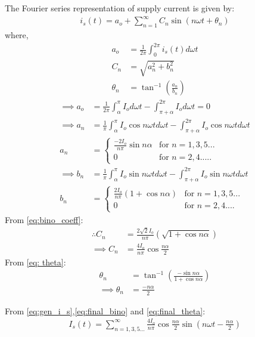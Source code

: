 \documentclass[journal,12pt,onecolumn]{IEEEtran}
\theoremstyle{remark}
\begin{document}
The Fourier series representation of supply current is given by:
\begin{align}
    i_s(t) = a_o +\sum_{n=1}^{\infty}C_n\sin({n\omega t} + \theta_n)\label{eq:gen_i_s}
\end{align}
 where,
 \begin{align}
 a_o &= \frac{1}{2\pi} \int_{0}^{2\pi} i_s(t)d\omega t \\
     C_n &= \sqrt{a_n^2 + b_n ^2}\label{eq:bino_coeff}\\
     \theta_n &= \tan^{-1}\left({\frac{a_n}{b_n}}\right)\label{eq: theta}
 \end{align}
\begin{align}
  \implies  a_o &= \frac{1}{2\pi}\int_{\alpha}^{\pi} I_o d\omega t - \int_{\pi + \alpha}^{2\pi} I_o d\omega t = 0\\
 \implies   a_n &= \frac{1}{\pi} \int_{\alpha}^{\pi}I_o\cos n\omega t d\omega t - \int_{\pi + \alpha}^{2\pi} I_o\cos{n\omega td\omega t}\\
 a_n &= 
 \begin{cases}
    \frac{-2I_o}{n\pi}\sin{n\alpha} & \text{for } n = 1,3,5...\\
     0 &\text{for } n = 2,4.....
    \end{cases}\\
 \implies   b_n &= \frac{1}{\pi}\int_{\alpha}^{\pi}I_o\sin n\omega t d\omega t - \int_{\pi + \alpha}^{2\pi} I_o\sin{n\omega td\omega t} \\
 b_n &= 
 \begin{cases}
     \frac{2I_o}{n\pi}\left(1 + \cos{n\alpha}\right) &\text{for } n = 1,3,5...\\
     0 &\text{for } n = 2, 4....
    \end{cases}
    \end{align}
From \eqref{eq:bino_coeff}:
\begin{align}
  \therefore  C_n &= \frac{2\sqrt{2}I_o}{n\pi}\left(\sqrt{1 + \cos{n\alpha}}\right)\\
  \implies  C_n &= \frac{4I_o}{n\pi}\cos{\frac{n\alpha}{2}}\label{eq:final_bino}
\end{align}
From \eqref{eq: theta}:
\begin{align}
    \theta_n &= \tan^{-1}\left(\frac{-\sin{n\alpha}}{1 + \cos{n\alpha}}\right)\\
    \implies \theta_n &= \frac{-n\alpha}{2}\label{eq:final_theta}
\end{align}

From \eqref{eq:gen_i_s},\eqref{eq:final_bino} and \eqref{eq:final_theta}:
\begin{align}
I_{s}(t) = \sum_{n=1,3,5...}^{\infty} \frac{4I_{o}}{n\pi}\cos{\frac{n\alpha}{2}}\sin{\left(n\omega t - \frac{n\alpha}{2}\right)}
\end{align}
\end{document}
